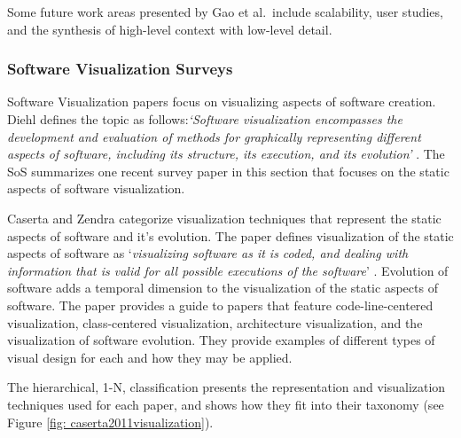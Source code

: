Some future work areas presented by Gao et al.\ include scalability, user studies, and the synthesis of high-level context with low-level detail.

\subsubsection{Software Visualization Surveys}
Software Visualization papers focus on visualizing aspects of software creation. Diehl defines the topic as follows:\textit{`Software visualization encompasses the development and evaluation of methods for graphically representing different aspects of software, including its structure, its execution, and its evolution'} \cite{diehl2007software}. The SoS summarizes one recent survey paper in this section that focuses on the static aspects of software visualization.

Caserta and Zendra categorize visualization techniques that represent the static aspects of software and it's evolution. The paper defines visualization of the static aspects of software as `\textit{visualizing software as it is coded, and dealing with information that is valid for all possible executions of the software}' \cite{caserta2011visualization}. Evolution of software adds a temporal dimension to the visualization of the static aspects of software.
The paper provides a guide to papers that feature code-line-centered visualization, class-centered visualization, architecture visualization, and the visualization of software evolution. They provide examples of different types of visual design for each and how they may be applied.

The hierarchical, 1-N, classification presents the representation and visualization techniques used for each paper, and shows how they fit into their taxonomy (see Figure \ref{fig: caserta2011visualization}).

